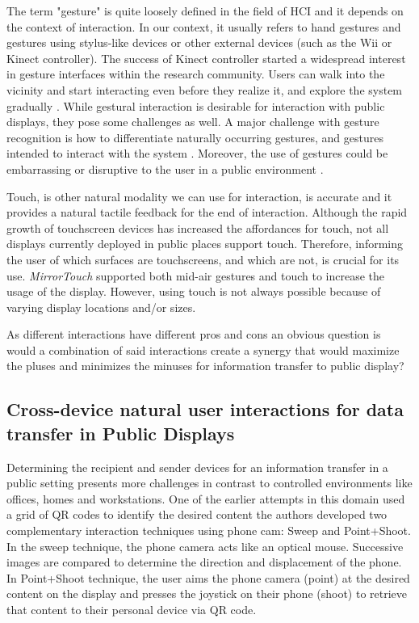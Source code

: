 The term "gesture" is quite loosely defined in the field of HCI and it depends on the context of interaction. In our context, it usually refers to hand gestures and gestures using stylus-like devices or other external devices (such as the Wii or Kinect controller). The success of Kinect controller started a widespread interest in gesture interfaces within the research community. Users can walk into the vicinity and start interacting even before they
realize it, and explore the system gradually \cite{Muller:2012}. While gestural interaction is desirable for interaction with public displays, they pose some
challenges as well. A major challenge with gesture recognition is how to differentiate naturally occurring  gestures, and gestures intended to interact with the system \cite{Wexelblat:1997}. Moreover, the use of gestures could be embarrassing or disruptive to the user in a public environment \cite{Rico:2010}. 

Touch, is other natural modality we can use for interaction, is accurate and it provides a natural tactile feedback for the end of interaction. Although the rapid growth of touchscreen devices has increased the affordances for touch, not all displays currently deployed in public places support touch. Therefore, informing the user of which surfaces are touchscreens, and which are not, is crucial for its use. \emph{MirrorTouch} supported both mid-air gestures and touch to increase the usage of the display\cite{Muller:2014}. However, using touch is not always possible because of varying display locations and/or sizes.

As different interactions have different pros and cons an obvious question is would a combination of said interactions create a synergy that would maximize the pluses and minimizes the minuses for information transfer to public display?

 \subsection{Cross-device natural user interactions for data transfer in Public Displays}
 Determining the recipient and sender devices for an information transfer in a public  setting presents more challenges in contrast to controlled environments like offices, homes and workstations. One of the earlier attempts in this domain used a grid of QR codes to identify the desired
 content \cite{Ballagas:2005} the authors developed two complementary interaction techniques using phone cam: Sweep and Point+Shoot. In the sweep technique, the phone camera acts like an optical mouse. Successive images are compared to determine the direction and displacement of the phone. In Point+Shoot technique, the user aims the phone camera (point) at the desired content on the display and presses the joystick on their phone (shoot) to retrieve that content to their personal device via QR code. 
 
